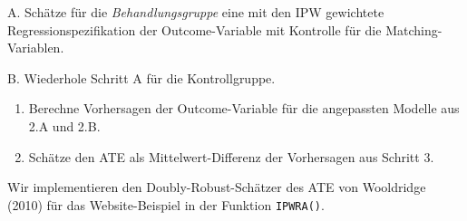 \documentclass[
  a4paper,
  DIV=11,
  oneside]{scrreprt}
\begin{document}
A. Schätze für die \emph{Behandlungsgruppe} eine mit den IPW gewichtete
Regressionspezifikation der Outcome-Variable mit Kontrolle für die
Matching-Variablen.

B. Wiederhole Schritt A für die Kontrollgruppe.

\begin{enumerate}
\def\labelenumi{\arabic{enumi}.}
\setcounter{enumi}{2}
\item
  Berechne Vorhersagen der Outcome-Variable für die angepassten Modelle
  aus 2.A und 2.B.
\item
  Schätze den ATE als Mittelwert-Differenz der Vorhersagen aus Schritt
  3.
\end{enumerate}

Wir implementieren den Doubly-Robust-Schätzer des ATE von Wooldridge
(2010) für das Website-Beispiel in der Funktion \texttt{IPWRA()}.
\end{document}

